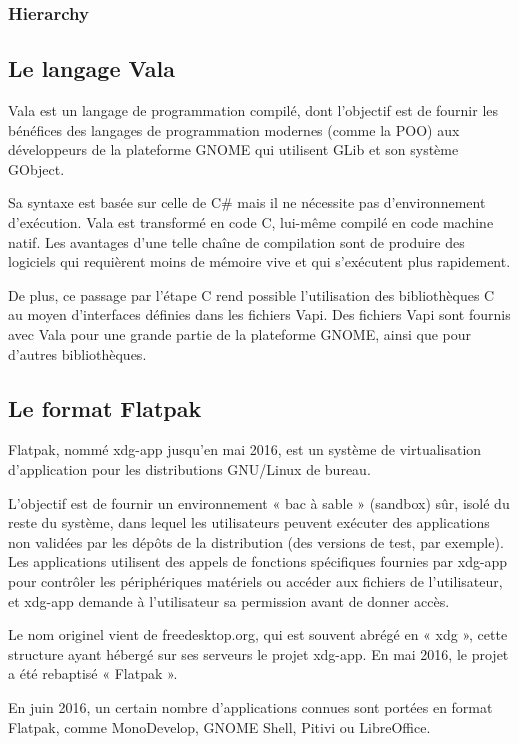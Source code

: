 \documentclass[12pt]{report}
\begin{document}
\subsubsection{Hierarchy}


\subsection{Le langage Vala}
Vala est un langage de programmation compilé, dont l'objectif est de
fournir les bénéfices des langages de programmation modernes (comme la
POO) aux développeurs de la plateforme GNOME qui utilisent GLib et son
système GObject.

Sa syntaxe est basée sur celle de C\# mais il ne nécessite pas
d'environnement d'exécution. Vala est transformé en code C, lui-même
compilé en code machine natif. Les avantages d'une telle chaîne de
compilation sont de produire des logiciels qui requièrent moins de
mémoire vive et qui s'exécutent plus rapidement.

De plus, ce passage par l'étape C rend possible l'utilisation des
bibliothèques C au moyen d'interfaces définies dans les fichiers
Vapi. Des fichiers Vapi sont fournis avec Vala pour une grande partie
de la plateforme GNOME, ainsi que pour d'autres bibliothèques.

\subsection{Le format Flatpak}
Flatpak, nommé xdg-app jusqu’en mai 2016, est un système de
virtualisation d’application pour les distributions GNU/Linux de
bureau.

L'objectif est de fournir un environnement « bac à sable » (sandbox)
sûr, isolé du reste du système, dans lequel les utilisateurs peuvent
exécuter des applications non validées par les dépôts de la
distribution (des versions de test, par exemple). Les applications
utilisent des appels de fonctions spécifiques fournies par xdg-app
pour contrôler les périphériques matériels ou accéder aux fichiers de
l'utilisateur, et xdg-app demande à l'utilisateur sa permission avant
de donner accès.

Le nom originel vient de freedesktop.org, qui est souvent abrégé en «
xdg », cette structure ayant hébergé sur ses serveurs le projet
xdg-app. En mai 2016, le projet a été rebaptisé « Flatpak ».

En juin 2016, un certain nombre d'applications connues sont portées en
format Flatpak, comme MonoDevelop, GNOME Shell, Pitivi ou LibreOffice.
\end{document}
